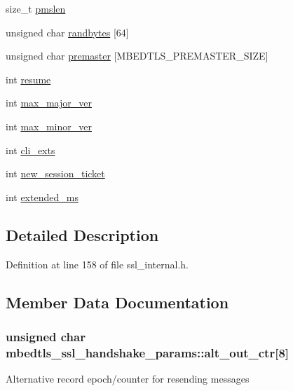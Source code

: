 \begin{DoxyCompactItemize}
\item 
size\-\_\-t \hyperlink{structmbedtls__ssl__handshake__params_afe09d4bb37384dbb6aa6d77f1fa38449}{pmslen}
\item 
unsigned char \hyperlink{structmbedtls__ssl__handshake__params_a7ccdd41754ab6c0ae3b7d1b3090ed1a5}{randbytes} \mbox{[}64\mbox{]}
\item 
unsigned char \hyperlink{structmbedtls__ssl__handshake__params_a2a6bbee172aff64433acb004134616a3}{premaster} \mbox{[}M\-B\-E\-D\-T\-L\-S\-\_\-\-P\-R\-E\-M\-A\-S\-T\-E\-R\-\_\-\-S\-I\-Z\-E\mbox{]}
\item 
int \hyperlink{structmbedtls__ssl__handshake__params_a2cb07171af1e3ed74fa45e795d063ba3}{resume}
\item 
int \hyperlink{structmbedtls__ssl__handshake__params_a43b54e0e0bb2b88402aa038ba85141a1}{max\-\_\-major\-\_\-ver}
\item 
int \hyperlink{structmbedtls__ssl__handshake__params_a23245feaafac570f7e64b3e3c2ef90d3}{max\-\_\-minor\-\_\-ver}
\item 
int \hyperlink{structmbedtls__ssl__handshake__params_a77de3ed4997da823dbeb52c02728fdc3}{cli\-\_\-exts}
\item 
int \hyperlink{structmbedtls__ssl__handshake__params_a576d0c2cbfd8b226f9def975403376ce}{new\-\_\-session\-\_\-ticket}
\item 
int \hyperlink{structmbedtls__ssl__handshake__params_ad230c6beea9b3ec7a5d6eb072c80e3db}{extended\-\_\-ms}
\end{DoxyCompactItemize}


\subsection{Detailed Description}


Definition at line 158 of file ssl\-\_\-internal.\-h.



\subsection{Member Data Documentation}
\hypertarget{structmbedtls__ssl__handshake__params_a5b4529651b9f246676e52a94d29fe303}{
\subsubsection[{alt\-\_\-out\-\_\-ctr}]{\setlength{\rightskip}{0pt plus 5cm}unsigned char mbedtls\-\_\-ssl\-\_\-handshake\-\_\-params\-::alt\-\_\-out\-\_\-ctr\mbox{[}8\mbox{]}}}\label{structmbedtls__ssl__handshake__params_a5b4529651b9f246676e52a94d29fe303}
Alternative record epoch/counter for resending messages 

